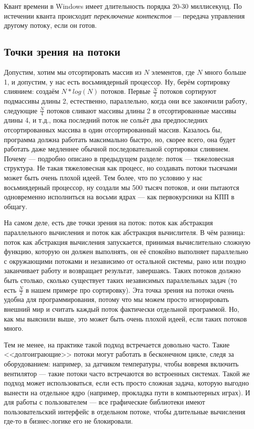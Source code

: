 \documentclass{../../text-style}
\begin{document}
Квант времени в Windows имеет длительность порядка 20-30 миллисекунд. По истечении кванта происходит \textit{переключение контекстов} --- передача управления другому потоку, если он готов.

\subsection{Точки зрения на потоки}

Допустим, хотим мы отсортировать массив из $N$ элементов, где $N$ много больше 1, и допустим, у нас есть восьмиядерный процессор. Ну, берём сортировку слиянием: создаём $N * log(N)$ потоков. Первые $\frac{N}{2}$ потоков сортируют подмассивы длины 2, естественно, параллельно, когда они все закончили работу, следующие $\frac{N}{4}$ потоков сливают массивы длины 2 в отсортированные массивы длины 4, и т.д., пока последний поток не сольёт два предпоследних отсортированных массива в один отсортированный массив. Казалось бы, программа должна работать максимально быстро, но, скорее всего, она будет работать даже медленнее обычной последовательной сортировки слиянием. Почему --- подробно описано в предыдущем разделе: поток --- тяжеловесная структура. Не такая тяжеловесная как процесс, но создавать потоки тысячами может быть очень плохой идеей. Тем более, что по условию у нас восьмиядерный процессор, ну создали мы 500 тысяч потоков, и они пытаются одновременно исполниться на восьми ядрах --- как первокурсники на КПП в общагу.

На самом деле, есть две точки зрения на поток: поток как абстракция параллельного вычисления и поток как абстракция вычислителя. В чём разница: поток как абстракция вычисления запускается, принимая вычислительно сложную функцию, которую он должен выполнять, он её спокойно выполняет параллельно с окружающими потоками и независимо от остальной системы, рано или поздно заканчивает работу и возвращает результат, завершаясь. Таких потоков должно быть столько, сколько существует таких независимых параллельных задач (то есть $\frac{N}{2}$ в нашем примере про сортировку). Эта точка зрения на потоки очень удобна для программирования, потому что мы можем просто игнорировать внешний мир и считать каждый поток фактически отдельной программой. Но, как мы выяснили выше, это может быть очень плохой идеей, если таких потоков много. 

Тем не менее, на практике такой подход встречается довольно часто. Такие <<долгоиграющие>> потоки могут работать в бесконечном цикле, следя за оборудованием: например, за датчиком температуры, чтобы вовремя включить вентилятор --- такие потоки часто встречаются во встроенных системах. Такой же подход может использоваться, если есть просто сложная задача, которую выгодно вынести на отдельное ядро (например, прокладка пути в компьютерных играх). И для работы с пользователем --- все графические библиотеки имеют пользовательский интерфейс в отдельном потоке, чтобы длительные вычисления где-то в бизнес-логике его не блокировали.
\end{document}
